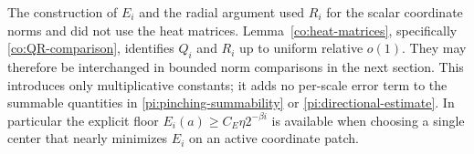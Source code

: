 \begin{remark}
\label{pi:heat-interface}
The construction of $E_i$ and the radial argument used $R_i$ for
the scalar coordinate norms and did not use the heat matrices.
Lemma~\ref{co:heat-matrices}, specifically
\eqref{co:QR-comparison}, identifies $Q_i$ and $R_i$ up to
uniform relative $o(1)$.  They may therefore be interchanged in
bounded norm comparisons in the next section.  This introduces
only multiplicative constants; it adds no per-scale error term
to the summable quantities in
\eqref{pi:pinching-summability} or
\eqref{pi:directional-estimate}.  In particular the explicit
floor $E_i(a)\ge C_E\eta2^{-\beta i}$ is available when choosing
a single center that nearly minimizes $E_i$ on an active
coordinate patch.
\end{remark}
